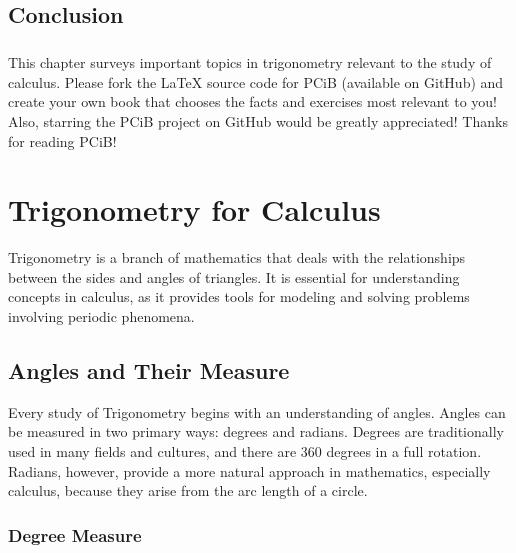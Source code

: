 \documentclass[a4paper,12pt]{book}
\newcounter{problem}
\begin{document}
\section*{Conclusion}
\paragraph{}
This chapter surveys important topics in trigonometry relevant to the study of calculus. Please fork the LaTeX source code for PCiB (available on GitHub) and create your own book that chooses the facts and exercises most relevant to you! Also, starring the PCiB project on GitHub would be greatly appreciated! Thanks for reading PCiB!


\chapter{Trigonometry for Calculus}
\label{chap:trigonometry}

Trigonometry is a branch of mathematics that deals with the relationships between the sides and angles of triangles. It is essential for understanding concepts in calculus, as it provides tools for modeling and solving problems involving periodic phenomena.


\section{Angles and Their Measure}
\label{sec:angles_measure}

Every study of Trigonometry begins with an understanding of angles. Angles can be measured in two primary ways: degrees and radians. Degrees are traditionally used in many fields and cultures, and there are \(360\) degrees in a full rotation. Radians, however, provide a more natural approach in mathematics, especially calculus, because they arise from the arc length of a circle.

\subsection{Degree Measure}
\label{subsec:degree_measure}
\end{document}
